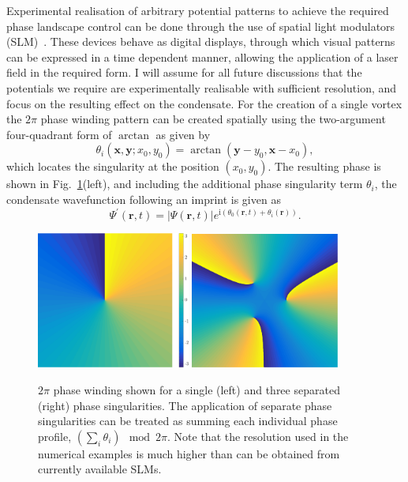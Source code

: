 {Experimental realisation of arbitrary potential patterns to achieve the required phase landscape control can be done through the use of spatial light modulators (SLM)~\cite{VTX:Moulder_pra_2012}. These devices behave as digital displays, through which visual patterns can be expressed in a time dependent manner, allowing the application of a laser field in the required form. I will assume for all future discussions that the potentials we require are experimentally realisable with sufficient resolution, and focus on the resulting effect on the condensate. For the creation of a single vortex the $2\pi$ phase winding pattern can be created spatially using the two-argument four-quadrant form of $\arctan$ as given by
\begin{equation}
    \theta_i(\mathbf{x},\mathbf{y};x_0,y_0) = \arctan(\mathbf{y}-y_0,\mathbf{x}-x_0),
\end{equation}
which locates the singularity at the position $\left(x_0,y_0\right)$. The resulting phase is shown in Fig.~\ref{fig:atan2phase}(left), and including the additional phase singularity term $\theta_i$, the condensate wavefunction following an imprint is given as
\begin{equation}
    \Psi^{'}(\mathbf{r},t) = |\Psi(\mathbf{r},t)|e^{\text{i}(\theta_0(\mathbf{r},t) + \theta_i(\mathbf{r}))}.
\end{equation}

\begin{figure}\centering
    \includegraphics[width=0.45\textwidth]{Images/ch4_vtx/2pi.pdf}
    \includegraphics[width=0.435\textwidth]{Images/ch4_vtx/3_2pi.pdf}
    \caption{$2\pi$ phase winding shown for a single (left) and three separated (right) phase singularities. The application of separate phase singularities can be treated as summing each individual phase profile, $\left(\displaystyle\sum\limits_i \theta_i \right)\mod 2\pi$. Note that the resolution used in the numerical examples is much higher than can be obtained from currently available SLMs.}\label{fig:atan2phase}
\end{figure}

}
